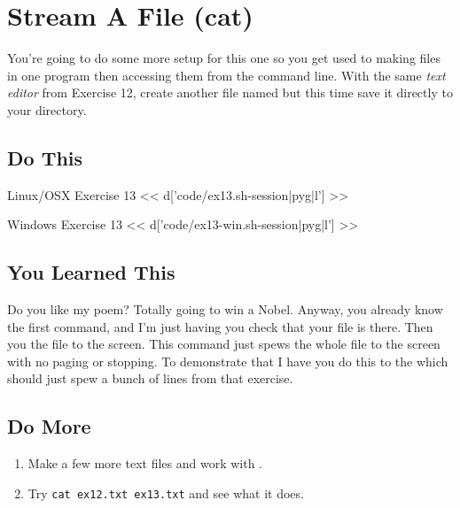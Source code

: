 \chapter{Stream A File (cat)}

You're going to do some more setup for this one so you get used to making files
in one program then accessing them from the command line.  With the same \emph{text editor} from
Exercise 12, create another file named  but this time save
it directly to your  directory.

\section{Do This}

\begin{code}{Linux/OSX Exercise 13}
<< d['code/ex13.sh-session|pyg|l'] >>
\end{code}

\begin{code}{Windows Exercise 13}
<< d['code/ex13-win.sh-session|pyg|l'] >>
\end{code}

\section{You Learned This}

Do you like my poem? Totally going to win a Nobel.  Anyway, you already know the first command, and I'm just having you check that your file is there.  Then you  the file to the screen.  This command just spews the whole file to the 
screen with no paging or stopping.  To demonstrate that I have you do this to the
 which should just spew a bunch of lines from that exercise.

\section{Do More}

\begin{enumerate}
\item Make a few more text files and work with .
\item Try \verb|cat ex12.txt ex13.txt| and see what it does.
\end{enumerate}

